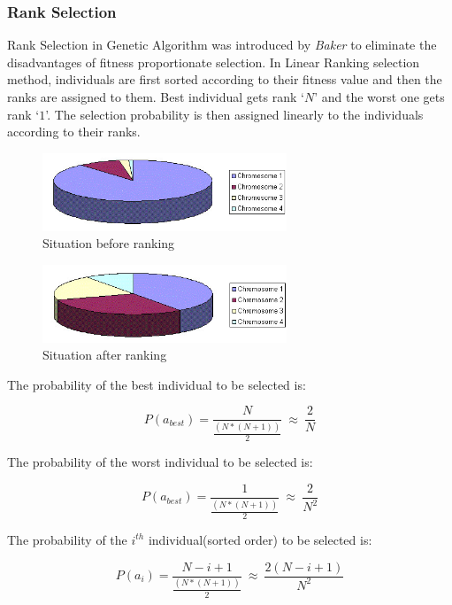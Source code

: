 \documentclass[a4paper, 12pt]{article}
\begin{document}
\subsubsection{Rank Selection}
Rank Selection in Genetic Algorithm was introduced by \textit{Baker} to eliminate the disadvantages of fitness proportionate selection. In Linear 
Ranking selection method, individuals are first sorted according to their fitness value and then the ranks are assigned to them. Best 
individual gets rank ‘$N$’ and the worst one gets rank ‘$1$’. The selection probability is then assigned linearly to the individuals according to 
their ranks.
\begin{figure}[h]
\centering
\includegraphics[width=0.65\textwidth, clip]{./rank.jpg}
\vspace{-0.15in}
\caption{Situation before ranking}
\label{fig:4}
\end{figure}
\begin{figure}[h]
\centering
\includegraphics[width=0.65\textwidth, clip]{./rank2.jpg}
\vspace{-0.15in}
\caption{Situation after ranking}
\label{fig:14}
\end{figure}
The probability of the best individual to be selected is:
\begin{large}
\boldmath\begin{equation*}
P\left(a_{best}\right) = \frac{N}{\frac{\left(N*\left(N+1\right)\right)}{2}}\ \approx\ \frac{2}{N}
\end{equation*}
\end{large}
The probability of the worst individual to be selected is:
\begin{large}
\boldmath\begin{equation*}
P\left(a_{best}\right) = \frac{1}{\frac{\left(N*\left(N+1\right)\right)}{2}}\ \approx\ \frac{2}{N^2}
\end{equation*}
\end{large}
The probability of the $i^{th}$ individual(sorted order) to be selected is:
\begin{large}
\boldmath\begin{equation*}
P\left(a_i\right) = \frac{N-i+1}{\frac{\left(N*\left(N+1\right)\right)}{2}}\ \approx\ \frac{2\left(N-i+1\right)}{N^2}
\end{equation*}
\end{large}
\end{document}
